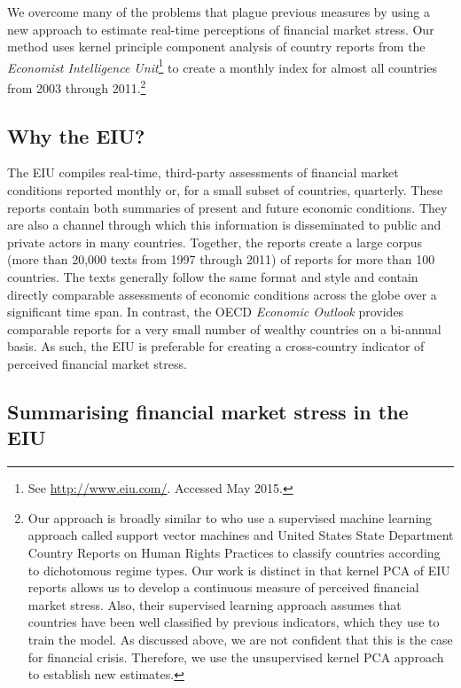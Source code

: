 \documentclass[]{article}
\begin{document}
We overcome many of the problems that plague previous measures by using a new approach to estimate real-time perceptions of financial market stress. Our method uses kernel principle component analysis \citep{Scholkopf1998,lodhi2002,Spirling2012} of country reports from the \emph{Economist Intelligence Unit}\footnote{See \url{http://www.eiu.com/}. Accessed May 2015.} to create a monthly index for almost all countries from 2003 through 2011.\footnote{Our approach is broadly similar to \cite{Minhas2015} who use a supervised machine learning approach called support vector machines and United States State Department Country Reports on Human Rights Practices to classify countries according to dichotomous regime types. Our work is distinct in that kernel PCA of EIU reports allows us to develop a continuous measure of perceived financial market stress. Also, their supervised learning approach assumes that countries have been well classified by previous indicators, which they use to train the model. As discussed above, we are not confident that this is the case for financial crisis. Therefore, we use the unsupervised kernel PCA approach to establish new estimates.}

\subsection{Why the EIU?}\label{why-the-eiu}

The EIU compiles real-time, third-party assessments of financial market conditions reported monthly or, for a small subset of countries, quarterly. These reports contain both summaries of present and future economic conditions. They are also a channel through which this information is disseminated to public and private actors in many countries. Together, the reports create a large corpus (more than 20,000 texts from 1997 through 2011) of reports for more than 100 countries. The texts generally follow the same format and style and contain directly comparable assessments of economic conditions across the globe over a significant time span. In contrast, the OECD \emph{Economic Outlook} provides comparable reports for a very small number of wealthy countries on a bi-annual basis. As such, the EIU is preferable for creating a cross-country indicator of perceived financial market stress.

\subsection{Summarising financial market stress in the
EIU}\label{summarizing-financial-market-stress-in-the-eiu}
\end{document}
